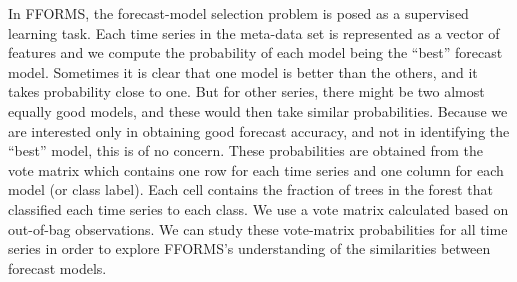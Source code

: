 \documentclass[11pt,a4paper,]{article}
\begin{document}
In FFORMS, the forecast-model selection problem is posed as a supervised learning task. Each time series in the meta-data set is represented as a vector of features and we compute the probability of each model being the ``best'' forecast model. Sometimes it is clear that one model is better than the others, and it takes probability close to one. But for other series, there might be two almost equally good models, and these would then take similar probabilities. Because we are interested only in obtaining good forecast accuracy, and not in identifying the ``best'' model, this is of no concern. These probabilities are obtained from the vote matrix which contains one row for each time series and one column for each model (or class label). Each cell contains the fraction of trees in the forest that classified each time series to each class. We use a vote matrix calculated based on out-of-bag observations. We can study these vote-matrix probabilities for all time series in order to explore FFORMS's understanding of the similarities between forecast models.
\end{document}
